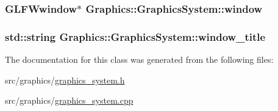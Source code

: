 \subsubsection[{window}]{\setlength{\rightskip}{0pt plus 5cm}G\+L\+F\+Wwindow$\ast$ Graphics\+::\+Graphics\+System\+::window\hspace{0.3cm}{\ttfamily [private]}}\label{class_graphics_1_1_graphics_system_a4430d61bb3fd528b617e8fea26744a8c}
\hypertarget{class_graphics_1_1_graphics_system_a7b543ac0f4323ec286519a3dfef0df1c}{}
\subsubsection[{window\+\_\+title}]{\setlength{\rightskip}{0pt plus 5cm}std\+::string Graphics\+::\+Graphics\+System\+::window\+\_\+title\hspace{0.3cm}{\ttfamily [private]}}\label{class_graphics_1_1_graphics_system_a7b543ac0f4323ec286519a3dfef0df1c}


The documentation for this class was generated from the following files\+:\begin{DoxyCompactItemize}
\item 
src/graphics/\hyperlink{graphics__system_8h}{graphics\+\_\+system.\+h}\item 
src/graphics/\hyperlink{graphics__system_8cpp}{graphics\+\_\+system.\+cpp}\end{DoxyCompactItemize}
